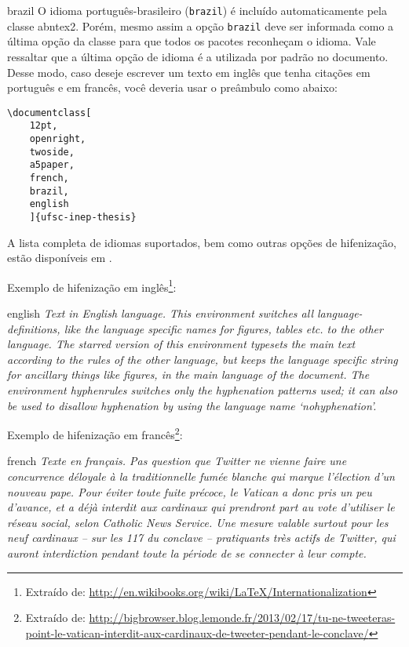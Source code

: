 \begin{otherlanguage*}{brazil}
O idioma português-brasileiro (\texttt{brazil}) é incluído automaticamente pela
classe \textsf{abntex2}. Porém, mesmo assim a opção \texttt{brazil} deve ser
informada como a última opção da classe para que todos os pacotes reconheçam o
idioma. Vale ressaltar que a última opção de idioma é a utilizada por padrão no
documento. Desse modo, caso deseje escrever um texto em inglês que tenha
citações em português e em francês, você deveria usar o preâmbulo como abaixo:

\begin{verbatim}
\documentclass[
    12pt,
    openright,
    twoside,
    a5paper,
    french,
    brazil,
    english
    ]{ufsc-inep-thesis}
\end{verbatim}

A lista completa de idiomas suportados, bem como outras opções de hifenização,
estão disponíveis em \textcite[p.~5-6]{babel}.

Exemplo de hifenização em inglês\footnote{Extraído de:
\url{http://en.wikibooks.org/wiki/LaTeX/Internationalization}}:

\begin{otherlanguage*}{english}
\textit{Text in English language. This environment switches all language\hyp{}definitions,
like the language specific names for figures, tables etc. to the other
language. The starred version of this environment typesets the main text
according to the rules of the other language, but keeps the language specific
string for ancillary things like figures, in the main language of the document.
The environment hyphenrules switches only the hyphenation patterns used; it can
also be used to disallow hyphenation by using the language name
`nohyphenation'.}
\end{otherlanguage*}

Exemplo de hifenização em francês\footnote{Extraído de:
\url{http://bigbrowser.blog.lemonde.fr/2013/02/17/tu-ne-tweeteras-point-le-vatican-interdit-aux-cardinaux-de-tweeter-pendant-le-conclave/}}:

\begin{otherlanguage*}{french}
\textit{Texte en français. Pas question que Twitter ne vienne faire une
concurrence déloyale à la traditionnelle fumée blanche qui mar\-que l'élection
d'un nouveau pape. Pour éviter toute fuite précoce, le Vatican a donc pris un
peu d'avance, et a déjà interdit aux cardinaux qui prendront part au vote
d'utiliser le réseau social, selon Catholic News Service. Une mesure valable
surtout pour les neuf cardinaux – sur les 117 du conclave – pratiquants très
actifs de Twitter, qui auront interdiction pendant toute la période de se
connecter à leur compte.}
\end{otherlanguage*}


\end{otherlanguage*}
